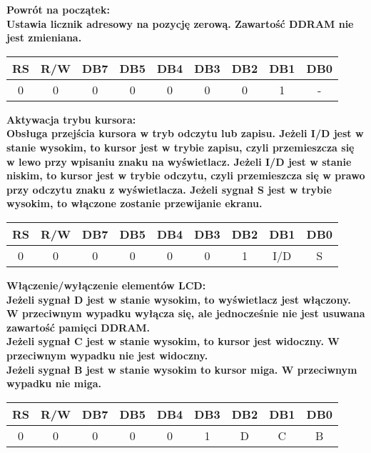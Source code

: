 \documentclass[a4paper,12pt]{article}
\newcommand{\h}[1]{\noindent \bf #1 \rm \\ \noindent}
\begin{document}
\h{Powrót na początek:}
Ustawia licznik adresowy na pozycję zerową. Zawartość DDRAM nie jest zmieniana.
\begin{table}[H]
	\centering
	\begin{tabular}{|c|c|c|c|c|c|c|c|c|}
		\hline
		\textbf{RS} & \textbf{R/W} & \textbf{DB7} & \textbf{DB5} & \textbf{DB4} & \textbf{DB3} & \textbf{DB2} & \textbf{DB1} & \textbf{DB0} \\ \hline
		0           & 0            & 0            & 0            & 0            & 0            & 0            & 1            & -            \\ \hline
	\end{tabular}
\end{table}

\newpage
\h{Aktywacja trybu kursora:}
Obsługa przejścia kursora w tryb odczytu lub zapisu. Jeżeli I/D jest w stanie wysokim, to kursor jest w trybie zapisu, czyli przemieszcza się w lewo przy wpisaniu znaku na wyświetlacz. Jeżeli I/D jest w stanie niskim, to kursor jest w trybie odczytu, czyli przemieszcza się w prawo przy odczytu znaku z wyświetlacza. Jeżeli sygnał S jest w trybie wysokim, to włączone zostanie przewijanie ekranu.
\begin{table}[H]
	\centering
	\begin{tabular}{|c|c|c|c|c|c|c|c|c|}
		\hline
		\textbf{RS} & \textbf{R/W} & \textbf{DB7} & \textbf{DB5} & \textbf{DB4} & \textbf{DB3} & \textbf{DB2} & \textbf{DB1} & \textbf{DB0} \\ \hline
		0           & 0            & 0            & 0            & 0            & 0            & 1            & I/D          & S            \\ \hline
	\end{tabular}
\end{table}

\h{Włączenie/wyłączenie elementów LCD:}
Jeżeli sygnał D jest w stanie wysokim, to wyświetlacz jest włączony. W przeciwnym wypadku wyłącza się, ale jednocześnie nie jest usuwana zawartość pamięci DDRAM.\\

\noindent
Jeżeli sygnał C jest w stanie wysokim, to kursor jest widoczny. W przeciwnym wypadku nie jest widoczny.\\

\noindent
Jeżeli sygnał B jest w stanie wysokim to kursor miga. W przeciwnym wypadku nie miga.
\begin{table}[H]
	\centering
	\begin{tabular}{|c|c|c|c|c|c|c|c|c|}
		\hline
		\textbf{RS} & \textbf{R/W} & \textbf{DB7} & \textbf{DB5} & \textbf{DB4} & \textbf{DB3} & \textbf{DB2} & \textbf{DB1} & \textbf{DB0} \\ \hline
		0           & 0            & 0            & 0            & 0            & 1            & D            & C            & B            \\ \hline
	\end{tabular}
\end{table}
\end{document}
